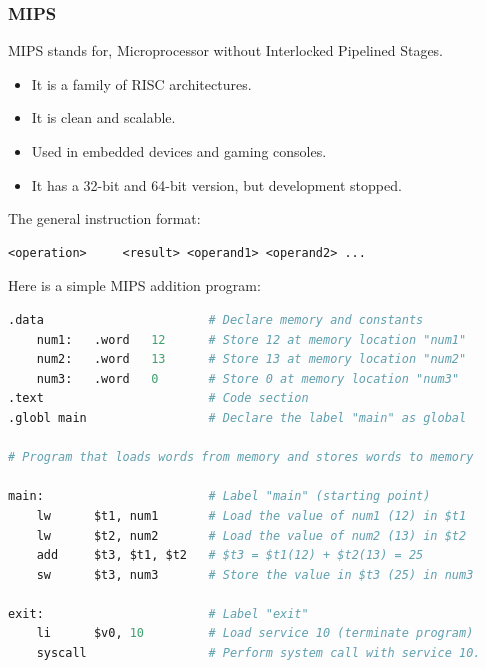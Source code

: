 \documentclass[11pt]{article}
\begin{document}
\subsubsection{MIPS}
MIPS stands for, Microprocessor without Interlocked Pipelined Stages.
\begin{itemize}
    \item It is a family of RISC architectures.
    \item It is clean and scalable.
    \item Used in embedded devices and gaming consoles.
    \item It has a 32-bit and 64-bit version, but development stopped.
\end{itemize}
The general instruction format:
\begin{lstlisting}
<operation>     <result> <operand1> <operand2> ...
\end{lstlisting}
Here is a simple MIPS addition program:
\begin{lstlisting}[language=Python]
.data                       # Declare memory and constants
    num1:   .word   12      # Store 12 at memory location "num1"
    num2:   .word   13      # Store 13 at memory location "num2"
    num3:   .word   0       # Store 0 at memory location "num3"
.text                       # Code section
.globl main                 # Declare the label "main" as global

# Program that loads words from memory and stores words to memory

main:                       # Label "main" (starting point)
    lw      $t1, num1       # Load the value of num1 (12) in $t1
    lw      $t2, num2       # Load the value of num2 (13) in $t2
    add     $t3, $t1, $t2   # $t3 = $t1(12) + $t2(13) = 25
    sw      $t3, num3       # Store the value in $t3 (25) in num3

exit:                       # Label "exit"
    li      $v0, 10         # Load service 10 (terminate program)
    syscall                 # Perform system call with service 10.
\end{lstlisting}
\end{document}
